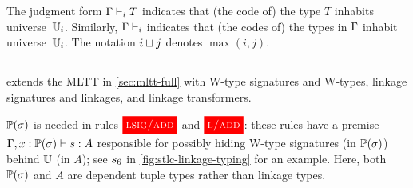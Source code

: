 The judgment form $\goodType{\Gm}{T}{i}$ indicates that (the code of) the type $T$
inhabits universe~$\cU_i$.
Similarly, $\goodCtx{\Gm}{i}$ indicates that (the codes of) the types in $\Gm$
inhabit universe~$\cU_i$.
The notation $i \lcup j$ denotes $\max(i,j)$.




\subsection{\TT}
\label{sec:fmltt-full}

\TT extends the MLTT in \cref{sec:mltt-full} with W-type signatures and W-types,
linkage signatures and linkages, and linkage transformers.






%

$\TyTkg{\lsig}$ is needed in rules $\ruleref{lsig/add}$ and $\ruleref{l/add}$:
these rules have a premise  $\goodTerm{\Gm,x : \TyTkg{\lsig}}{\seal}{A}$
responsible for possibly hiding W-type signatures (in $\TyTkg{\lsig}$) behind $\cU$ (in $A$);
see $\seal_6$ in \cref{fig:stlc-linkage-typing} for an example.
Here, both $\TyTkg{\lsig}$ and $A$ are dependent tuple types rather than linkage types.


